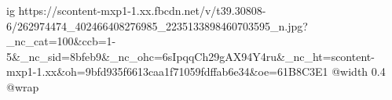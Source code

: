  
 
 
 
 

\ifcmt
  ig https://scontent-mxp1-1.xx.fbcdn.net/v/t39.30808-6/262974474_402466408276985_2235133898460703595_n.jpg?_nc_cat=100&ccb=1-5&_nc_sid=8bfeb9&_nc_ohc=6sIpqqCh29gAX94Y4ru&_nc_ht=scontent-mxp1-1.xx&oh=9bfd935f6613caa1f71059fdffab6e34&oe=61B8C3E1
  @width 0.4
  @wrap 
\fi
